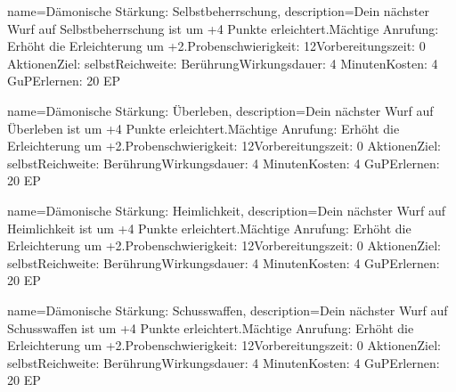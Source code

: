 {
    name={Dämonische Stärkung: Selbstbeherrschung},
    description={Dein nächster Wurf auf Selbstbeherrschung ist um +4 Punkte erleichtert.\newline Mächtige Anrufung: Erhöht die Erleichterung um +2.\newline Probenschwierigkeit: 12\newline Vorbereitungszeit: 0 Aktionen\newline Ziel: selbst\newline Reichweite: Berührung\newline Wirkungsdauer: 4 Minuten\newline Kosten: 4 GuP\newline Erlernen: 20 EP}
}


{
    name={Dämonische Stärkung: Überleben},
    description={Dein nächster Wurf auf Überleben ist um +4 Punkte erleichtert.\newline Mächtige Anrufung: Erhöht die Erleichterung um +2.\newline Probenschwierigkeit: 12\newline Vorbereitungszeit: 0 Aktionen\newline Ziel: selbst\newline Reichweite: Berührung\newline Wirkungsdauer: 4 Minuten\newline Kosten: 4 GuP\newline Erlernen: 20 EP}
}


{
    name={Dämonische Stärkung: Heimlichkeit},
    description={Dein nächster Wurf auf Heimlichkeit ist um +4 Punkte erleichtert.\newline Mächtige Anrufung: Erhöht die Erleichterung um +2.\newline Probenschwierigkeit: 12\newline Vorbereitungszeit: 0 Aktionen\newline Ziel: selbst\newline Reichweite: Berührung\newline Wirkungsdauer: 4 Minuten\newline Kosten: 4 GuP\newline Erlernen: 20 EP}
}


{
    name={Dämonische Stärkung: Schusswaffen},
    description={Dein nächster Wurf auf Schusswaffen ist um +4 Punkte erleichtert.\newline Mächtige Anrufung: Erhöht die Erleichterung um +2.\newline Probenschwierigkeit: 12\newline Vorbereitungszeit: 0 Aktionen\newline Ziel: selbst\newline Reichweite: Berührung\newline Wirkungsdauer: 4 Minuten\newline Kosten: 4 GuP\newline Erlernen: 20 EP}
}



